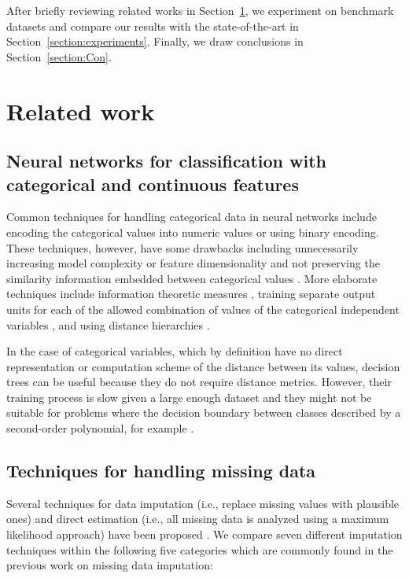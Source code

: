 \documentclass[10pt,twocolumn,letterpaper]{article}
\begin{document}
After briefly reviewing related works in Section~\ref{section:rw}, we experiment on benchmark datasets and compare our results with the state-of-the-art in Section~\ref{section:experiments}. Finally, we draw conclusions in Section~\ref{section:Con}.

\section{Related work}  \label{section:rw}

\subsection{Neural networks for classification with categorical and continuous features}

Common techniques for handling categorical data in
neural networks include encoding the categorical values into numeric values
or using binary encoding. These techniques, however, have some drawbacks
including unnecessarily increasing model complexity or feature dimensionality
and not preserving the similarity information embedded between categorical
values \cite{hsu2006generalizing}. More elaborate techniques include information theoretic measures
\cite{wang2008categorical}, training separate output units for
each of the allowed combination of values of the categorical independent
variables \cite{brouwer2002feed}, and using distance
hierarchies \cite{hsu2006generalizing}. 

In the case of categorical variables, which by definition have no direct
representation or computation scheme of the distance between its values,
decision trees can be useful because they do not require distance metrics.
However, their training process is slow given a large enough dataset and they
might not be suitable for problems where the decision boundary between classes
described by a second-order polynomial, for example \cite{fayyad1996data}.

\subsection{Techniques for handling missing data} \label{section:techniques}
Several techniques for data imputation (i.e., replace missing values with plausible ones) and
direct estimation (i.e., all missing data is analyzed using a maximum likelihood
approach) have been proposed \cite{de2003prevention}. We compare seven different imputation techniques within the following five categories which are commonly found in the previous work on missing data imputation\cite{batista2003analysis}:
\end{document}
